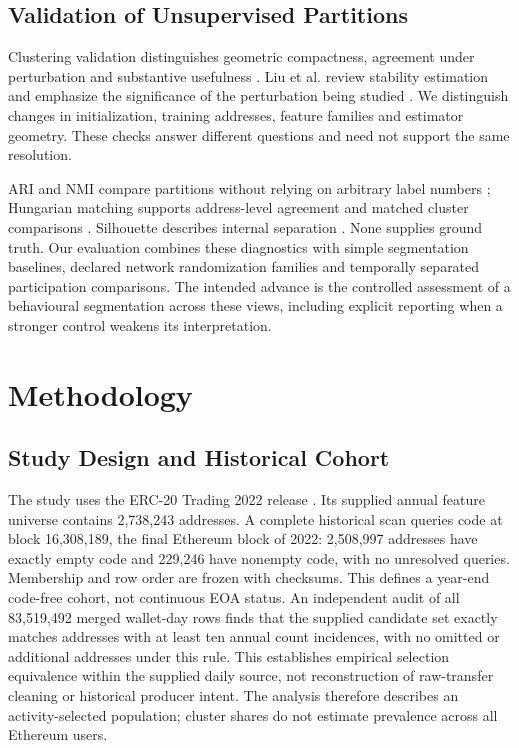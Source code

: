 \documentclass[journal,letterpaper]{IEEEtran}
\begin{document}
\subsection{Validation of Unsupervised Partitions}
Clustering validation distinguishes geometric compactness, agreement under perturbation and substantive usefulness \cite{halkidi2001validation}. Liu et al. review stability estimation and emphasize the significance of the perturbation being studied \cite{liu2022stability}. We distinguish changes in initialization, training addresses, feature families and estimator geometry. These checks answer different questions and need not support the same resolution.

ARI and NMI compare partitions without relying on arbitrary label numbers \cite{hubert1985partitions,vinh2010information}; Hungarian matching supports address-level agreement and matched cluster comparisons \cite{kuhn1955hungarian}. Silhouette describes internal separation \cite{rousseeuw1987silhouettes}. None supplies ground truth. Our evaluation combines these diagnostics with simple segmentation baselines, declared network randomization families and temporally separated participation comparisons. The intended advance is the controlled assessment of a behavioural segmentation across these views, including explicit reporting when a stronger control weakens its interpretation.

\section{Methodology}
\subsection{Study Design and Historical Cohort}
The study uses the ERC-20 Trading 2022 release \cite{somin2025erc2022,somin2025dataset}. Its supplied annual feature universe contains 2,738,243 addresses. A complete historical scan queries code at block 16,308,189, the final Ethereum block of 2022: 2,508,997 addresses have exactly empty code and 229,246 have nonempty code, with no unresolved queries. Membership and row order are frozen with checksums. This defines a year-end code-free cohort, not continuous EOA status. An independent audit of all 83,519,492 merged wallet-day rows finds that the supplied candidate set exactly matches addresses with at least ten annual count incidences, with no omitted or additional addresses under this rule. This establishes empirical selection equivalence within the supplied daily source, not reconstruction of raw-transfer cleaning or historical producer intent. The analysis therefore describes an activity-selected population; cluster shares do not estimate prevalence across all Ethereum users.
\end{document}
